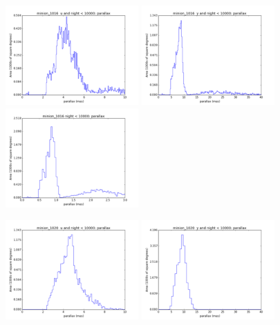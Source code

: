\begin{figure}[ht]
  \begin{center}
  \includegraphics[width=2.0in]{./figs/milkyway/astromPanels/MW_Astrom_paError_Baseline_u_hst.png}
  \includegraphics[width=2.0in]{./figs/milkyway/astromPanels/MW_Astrom_paError_Baseline_y_hst.png}
  \includegraphics[width=2.0in]{./figs/milkyway/astromPanels/MW_Astrom_paError_Baseline_10y_hst.png}
  \end{center}
  \begin{center}
  \includegraphics[width=2.0in]{./figs/milkyway/astromPanels/MW_Astrom_paError_PanSTARRS_u_hst.png}
  \includegraphics[width=2.0in]{./figs/milkyway/astromPanels/MW_Astrom_paError_PanSTARRS_y_hst.png}

\end{center}
\end{figure}
